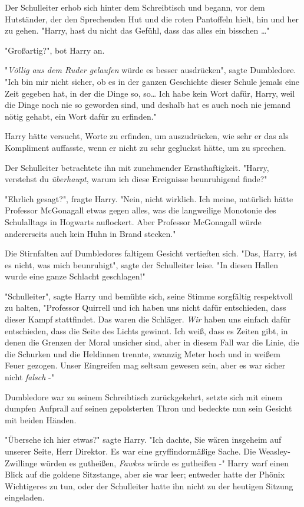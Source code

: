 {Der Schulleiter erhob sich hinter dem Schreibtisch und begann, vor dem Hutständer, der den Sprechenden Hut und die roten Pantoffeln hielt, hin und her zu gehen. "Harry, hast du nicht das Gefühl, dass das alles ein bisschen …"

"Großartig?", bot Harry an.

"\emph{Völlig aus dem Ruder gelaufen} würde es besser ausdrücken", sagte Dumbledore. "Ich bin mir nicht sicher, ob es in der ganzen Geschichte dieser Schule jemals eine Zeit gegeben hat, in der die Dinge so, so… Ich habe kein Wort dafür, Harry, weil die Dinge noch nie so geworden sind, und deshalb hat es auch noch nie jemand nötig gehabt, ein Wort dafür zu erfinden."

Harry hätte versucht, Worte zu erfinden, um auszudrücken, wie sehr er das als Kompliment auffasste, wenn er nicht zu sehr gegluckst hätte, um zu sprechen.

Der Schulleiter betrachtete ihn mit zunehmender Ernsthaftigkeit. "Harry, verstehst du \emph{überhaupt}, warum ich diese Ereignisse beunruhigend finde?"

"Ehrlich gesagt?", fragte Harry. "Nein, nicht wirklich. Ich meine, natürlich hätte Professor McGonagall etwas gegen alles, was die langweilige Monotonie des Schulalltags in Hogwarts auflockert. Aber Professor McGonagall würde andererseits auch kein Huhn in Brand stecken."

Die Stirnfalten auf Dumbledores faltigem Gesicht vertieften sich. "Das, Harry, ist es nicht, was mich beunruhigt", sagte der Schulleiter leise. "In diesen Hallen wurde eine ganze Schlacht geschlagen!"

"Schulleiter", sagte Harry und bemühte sich, seine Stimme sorgfältig respektvoll zu halten, "Professor Quirrell und ich haben uns nicht dafür entschieden, dass dieser Kampf stattfindet. Das waren die Schläger. \emph{Wir} haben uns einfach dafür entschieden, dass die Seite des Lichts gewinnt. Ich weiß, dass es Zeiten gibt, in denen die Grenzen der Moral unsicher sind, aber in diesem Fall war die Linie, die die Schurken und die Heldinnen trennte, zwanzig Meter hoch und in weißem Feuer gezogen. Unser Eingreifen mag seltsam gewesen sein, aber es war sicher nicht \emph{falsch} -"

Dumbledore war zu seinem Schreibtisch zurückgekehrt, setzte sich mit einem dumpfen Aufprall auf seinen gepolsterten Thron und bedeckte nun sein Gesicht mit beiden Händen.

"Übersehe ich hier etwas?" sagte Harry. "Ich dachte, Sie wären insgeheim auf unserer Seite, Herr Direktor. Es war eine gryffindormäßige Sache. Die Weasley-Zwillinge würden es gutheißen, \emph{Fawkes} würde es gutheißen -" Harry warf einen Blick auf die goldene Sitzstange, aber sie war leer; entweder hatte der Phönix Wichtigeres zu tun, oder der Schulleiter hatte ihn nicht zu der heutigen Sitzung eingeladen.

}
